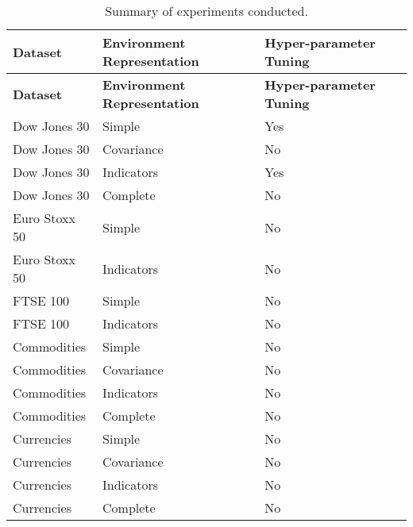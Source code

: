 \begin{longtable}{|p{3cm}|p{3cm}|p{3.5cm}|p{3.5cm}|}
    \caption{Summary of experiments conducted.}
    \label{tab:experiments-summary}
    \\ 
    \hline
    \textbf{Dataset} & \textbf{Environment Representation} & \textbf{Hyper-parameter Tuning} \\ \midrule
    \endfirsthead

    \hline
    \textbf{Dataset} & \textbf{Environment Representation} & \textbf{Hyper-parameter Tuning} \\ \midrule
    \endhead

    \endfoot
    \hline
    Dow Jones 30    & Simple         & Yes \\ \hline
    Dow Jones 30    & Covariance     & No \\ \hline
    Dow Jones 30    & Indicators     & Yes \\ \hline
    Dow Jones 30    & Complete       & No \\ \hline
    Euro Stoxx 50   & Simple         & No  \\ \hline
    Euro Stoxx 50   & Indicators     & No  \\ \hline
    FTSE 100        & Simple         & No  \\ \hline
    FTSE 100        & Indicators     & No  \\ \hline
    Commodities     & Simple         & No  \\ \hline
    Commodities     & Covariance     & No  \\ \hline
    Commodities     & Indicators     & No  \\ \hline
    Commodities     & Complete       & No  \\ \hline
    Currencies      & Simple         & No  \\ \hline
    Currencies      & Covariance     & No  \\ \hline
    Currencies      & Indicators     & No  \\ \hline
    Currencies      & Complete       & No  \\ \hline
\end{longtable}

